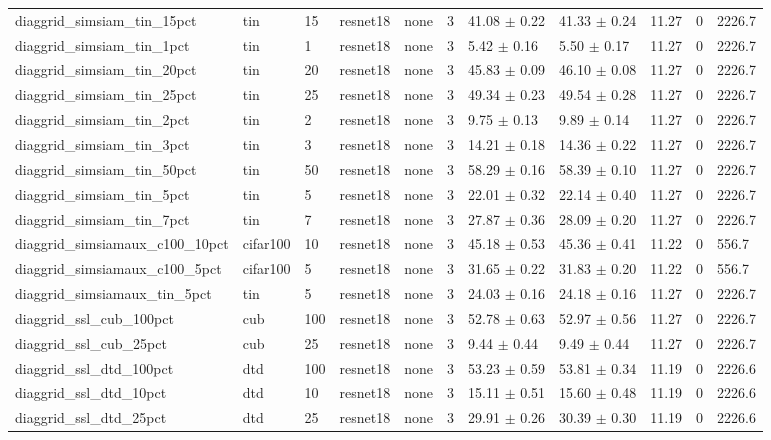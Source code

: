 \begin{tabular}{lllllllllll}
diaggrid_simsiam_tin_15pct & tin & 15 & resnet18 & none & 3 & 41.08 $\pm$ 0.22 & 41.33 $\pm$ 0.24 & 11.27 & 0 & 2226.7 \\
diaggrid_simsiam_tin_1pct & tin & 1 & resnet18 & none & 3 & 5.42 $\pm$ 0.16 & 5.50 $\pm$ 0.17 & 11.27 & 0 & 2226.7 \\
diaggrid_simsiam_tin_20pct & tin & 20 & resnet18 & none & 3 & 45.83 $\pm$ 0.09 & 46.10 $\pm$ 0.08 & 11.27 & 0 & 2226.7 \\
diaggrid_simsiam_tin_25pct & tin & 25 & resnet18 & none & 3 & 49.34 $\pm$ 0.23 & 49.54 $\pm$ 0.28 & 11.27 & 0 & 2226.7 \\
diaggrid_simsiam_tin_2pct & tin & 2 & resnet18 & none & 3 & 9.75 $\pm$ 0.13 & 9.89 $\pm$ 0.14 & 11.27 & 0 & 2226.7 \\
diaggrid_simsiam_tin_3pct & tin & 3 & resnet18 & none & 3 & 14.21 $\pm$ 0.18 & 14.36 $\pm$ 0.22 & 11.27 & 0 & 2226.7 \\
diaggrid_simsiam_tin_50pct & tin & 50 & resnet18 & none & 3 & 58.29 $\pm$ 0.16 & 58.39 $\pm$ 0.10 & 11.27 & 0 & 2226.7 \\
diaggrid_simsiam_tin_5pct & tin & 5 & resnet18 & none & 3 & 22.01 $\pm$ 0.32 & 22.14 $\pm$ 0.40 & 11.27 & 0 & 2226.7 \\
diaggrid_simsiam_tin_7pct & tin & 7 & resnet18 & none & 3 & 27.87 $\pm$ 0.36 & 28.09 $\pm$ 0.20 & 11.27 & 0 & 2226.7 \\
diaggrid_simsiamaux_c100_10pct & cifar100 & 10 & resnet18 & none & 3 & 45.18 $\pm$ 0.53 & 45.36 $\pm$ 0.41 & 11.22 & 0 & 556.7 \\
diaggrid_simsiamaux_c100_5pct & cifar100 & 5 & resnet18 & none & 3 & 31.65 $\pm$ 0.22 & 31.83 $\pm$ 0.20 & 11.22 & 0 & 556.7 \\
diaggrid_simsiamaux_tin_5pct & tin & 5 & resnet18 & none & 3 & 24.03 $\pm$ 0.16 & 24.18 $\pm$ 0.16 & 11.27 & 0 & 2226.7 \\
diaggrid_ssl_cub_100pct & cub & 100 & resnet18 & none & 3 & 52.78 $\pm$ 0.63 & 52.97 $\pm$ 0.56 & 11.27 & 0 & 2226.7 \\
diaggrid_ssl_cub_25pct & cub & 25 & resnet18 & none & 3 & 9.44 $\pm$ 0.44 & 9.49 $\pm$ 0.44 & 11.27 & 0 & 2226.7 \\
diaggrid_ssl_dtd_100pct & dtd & 100 & resnet18 & none & 3 & 53.23 $\pm$ 0.59 & 53.81 $\pm$ 0.34 & 11.19 & 0 & 2226.6 \\
diaggrid_ssl_dtd_10pct & dtd & 10 & resnet18 & none & 3 & 15.11 $\pm$ 0.51 & 15.60 $\pm$ 0.48 & 11.19 & 0 & 2226.6 \\
diaggrid_ssl_dtd_25pct & dtd & 25 & resnet18 & none & 3 & 29.91 $\pm$ 0.26 & 30.39 $\pm$ 0.30 & 11.19 & 0 & 2226.6 \\

\end{tabular}
